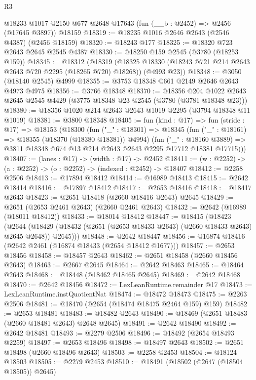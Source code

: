 \begin{lexlean}{R3}
\begin{coremodule}
    @18233
    @1017
    @2150
    @677
    @2648
    @17643
    (fun (__b : @2452) => @2456 (@17645 @3897))
    @18159
@18319 := @18235 @1016 @2646 @2643 (@2546 @4387) (@2456 @18159)
@18320 := @18243 @177
@18325 := @18320 @723 @2643 @2645 @2545 @4387
@18330 := @18250 @159 @2545 (@3780 (@18253 @159))
@18345 := @18312
    (@18319
      (@18325 @18330 (@18243 @721 @214 @2643 @2643 @720 @2295 (@18265 @720) @18268))
      (@4993 @23))
@18348 := @3050 (@18140 @2545) @4999
@18355 := @3753 @18348 @661 @2149 @2646 @2643 @4973 @4975
@18356 := @3766 @18348
@18370 := @18356
    @204
    @1022
    @2643
    @2645
    @2545
    @4429
    (@3775 @18348 @23 @2545 (@3780 (@3781 @18348 @23)))
@18380 := @18356 @1020 @214 @2643 @2643 @1019 @2295 (@3794 @18348 @11 @1019)
@18381 := @3800 @18348
@18405 := fun (kind : @17) =>
  fun (stride : @17) =>
  @18153
    (@18300
      (fun ("_" : @18301) =>
      @18345
        (fun ("_" : @18161) => @18355 (@18370 (@18380 @18381)) @4994)
        (fun ("_" : @18160 @3889) =>
        @3811 @18348 @674 @13 @214 @2643 @2643 @2295 @17712 @18381 @17715)))
@18407 := (lanes : @17) -> (width : @17) -> @2452
@18411 := (w : @2252) -> (a : @2252) -> (o : @2252) -> (indexed : @2452) -> @18407
@18412 := @2258 @2506
@18413 := @17894 @18412
@18414 := @16989 @18413
@18415 := @2642 @18414
@18416 := @17897 @18412
@18417 := @2653 @18416
@18418 := @18417 @2643
@18423 := @2651 @18418 (@2660 @18416 @2643) @2645
@18429 := @2651 (@2653 @2461 @2643) (@2660 @2461 @2643)
@18432 := @2642 (@16989 (@18011 @18412))
@18433 := @18014 @18412
@18447 := @18415
    (@18423
      (@2644 (@18429 (@18432 (@2651 (@2653 @18433 @2643) (@2660 @18433 @2643) @2645 @2648)) @2645)))
@18448 := @2642 @18447
@18456 := @16874 @18416 (@2642 @2461 (@16874 @18433 (@2654 @18412 @1677)))
@18457 := @2653 @18456
@18458 := @18457 @2643
@18462 := @2651 @18458 (@2660 @18456 @2643)
@18463 := @2667 @2645
@18464 := @2642 @18463
@18465 := @18464 @2643
@18468 := @18448 (@18462 @18465 @2645)
@18469 := @2642 @18468
@18470 := @2642 @18456
@18472 := LexLeanRuntime.remainder @17
@18473 := LexLeanRuntime.instQuotientNat
@18474 := @18472 @18473
@18475 := @2263 @2506
@18481 := @18470 (@2654 (@18474 @18475 @2464 @159) @159)
@18482 := @2653 @18481
@18483 := @18482 @2643
@18490 := @18469 (@2651 @18483 (@2660 @18481 @2643) @2648 @2645)
@18491 := @2642 @18490
@18492 := @2642 @18481
@18493 := @2279 @2506
@18496 := @18492 (@2654 @18493 @2259)
@18497 := @2653 @18496
@18498 := @18497 @2643
@18502 := @2651 @18498 (@2660 @18496 @2643)
@18503 := @2258 @2453
@18504 := @18124 @18503
@18505 := @2279 @2453
@18510 := @18491 (@18502 (@2647 (@18504 @18505)) @2645)

\end{coremodule}
\end{lexlean}
